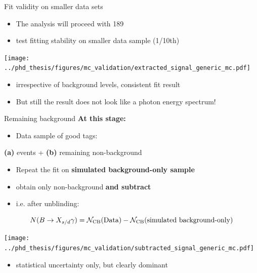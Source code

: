 \documentclass[xcolor=dvipsnames]{beamer}
\begin{document}
\begin{frame}{Fit validity on smaller data sets}
   \scriptsize\centering
   \begin{itemize}
      \item The analysis will proceed with 189~\invfb
      \item[\ra] test fitting stability on smaller data sample (1/10th)
   \end{itemize}

      \texttt{[image: ../phd\_thesis/figures/mc\_validation/extracted\_signal\_generic\_mc.pdf]}
  \begin{itemize}
   \item[\ra] irrespective of background levels, consistent fit result
   \item[\ra] But still the result does not look like a photon energy spectrum!   
  \end{itemize}
\end{frame}

\begin{frame}{Remaining background}
\scriptsize\centering
\textbf{At this stage:}
   \begin{itemize}
      \item Data sample of {\color{ForestGreen} good tags}:
   \end{itemize}
       \textbf{(a)} \BtoXsgamma events + \textbf{(b)} remaining non-\BtoXsgamma background
   \begin{itemize}
      \item Repeat the fit on \textbf{simulated background-only sample}
      \item[\ra] obtain only non-\BtoXsgamma background \textbf{and subtract}
      \item i.e. after unblinding:
   \end{itemize}
   \begin{equation*}
      N(\BtoXsdgamma) = \mathcal{N}_{\mathrm{CB}}(\text{Data}) - \mathcal{N}_{\mathrm{CB}}(\text{simulated background-only}) 
   \end{equation*}



   \texttt{[image: ../phd\_thesis/figures/mc\_validation/subtracted\_signal\_generic\_mc.pdf]}

\begin{itemize}
   \item[\ra] statistical uncertainty only, but clearly dominant 
\end{itemize}

\end{frame}
\end{document}
